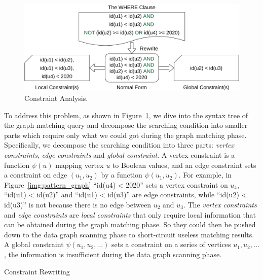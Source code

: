 \begin{figure}[ht]
  \centering
  \includegraphics[width=.45\textwidth]{img/constraints.pdf}
  \caption{Constraint Analysis.}\label{img:constraints}
\end{figure}

To address this problem, as shown in Figure~\ref{img:constraints},
we dive into the syntax tree of the graph matching query and decompose the searching condition into smaller parts which require only what we could got during the graph matching phase.
Specifically, we decompose the searching condition into three parts: \emph{vertex constraints}, \emph{edge constraints} and \emph{global constraint}.
A vertex constraint is a function $\psi(u)$ mapping vertex $u$ to Boolean values,
and an edge constraint sets a constraint on edge $(u_1, u_2)$ by a function $\psi(u_1, u_2)$.
For example, in Figure~\ref{img:pattern_graph} ``{id(u4) < 2020}'' sets a vertex constraint on $u_4$,
``{id(u1) < id(u2)}'' and ``{id(u1) < id(u3)}'' are edge constraints,
while ``{id(u2) < id(u3)}'' is not because there is no edge between $u_2$ and $u_3$.
The \emph{vertex constraints} and \emph{edge constraints} are \emph{local constraints} that only require local information that can be obtained during the graph matching phase.
So they could then be pushed down to the data graph scanning phase to short-circuit useless matching results.
A global constraint $\psi(u_1, u_2, \dots)$ sets a constraint on a series of vertices $u_1, u_2, \dots$,
the information is insufficient during the data graph scanning phase.

\begin{algorithm}[ht]
  \caption{Constraint Rewriting}\label{alg:rewrite}
\end{algorithm}

